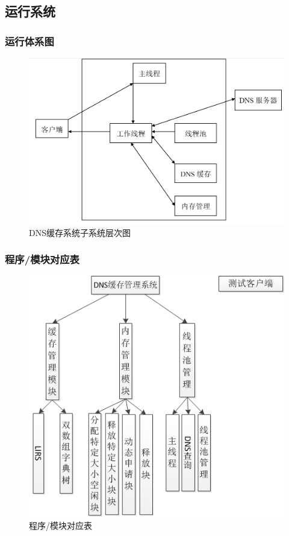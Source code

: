 \documentclass[12pt, a4paper, titlepage]{article}
\begin{document}
\subsection{运行系统}
\subsubsection{运行体系图}
\begin{figure}[H]
\centering
\includegraphics[keepaspectratio, scale=0.5]{pitures/xitongyunxing.png}
\caption{DNS缓存系统子系统层次图}
\end{figure}
\subsubsection{程序/模块对应表}
\begin{figure}[H]
\centering
\includegraphics[keepaspectratio, scale=1]{pitures/struct.png}
\caption{程序/模块对应表}
\end{figure}
\end{document}
